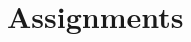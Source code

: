 \documentclass{article}
\author{Leopold Lemmermann}
\begin{document}
\createtitle

\section{Assignments}
%

%

%
\end{document}
